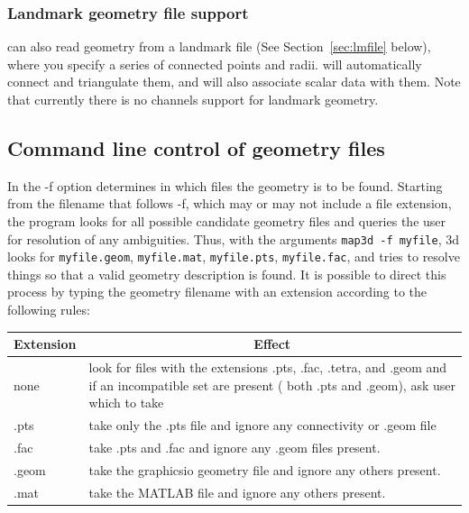 \subsubsection{Landmark geometry file support}
\label{sec:landmarkgeom}

\map{} can also read geometry from a landmark file 
(See Section~\ref{sec:lmfile} below), where you specify a series
of connected points and radii.  \map{} will automatically connect
and triangulate them, and will also associate scalar data with them.
Note that currently there is no channels support for landmark geometry.



\subsection{Command line control of geometry files}
\label{sec:readgeom}


In \map{} the -f option determines in which files the geometry is to be
found.  Starting from the filename that follows -f, which may or may not
include a file extension, the program looks for all possible candidate
geometry files and queries the user for resolution of any ambiguities.
Thus, with the arguments {\tt map3d -f myfile}, \map3d{} looks for
\texttt{myfile.geom}, \texttt{myfile.mat}, \texttt{myfile.pts},
\texttt{myfile.fac}, \etc{} and tries to resolve things so that a valid
geometry description is found.  It is possible to direct this process by
typing the geometry filename with an extension according to the following
rules:
%
\begin{center}
\begin{tabular}{|l|p{4in}|} \hline
\multicolumn{1}{|c|}{Extension} &
\multicolumn{1}{|c|}{Effect} \\ \hline
none & look for files with the extensions .pts, .fac, .tetra, and .geom and
if an incompatible set are present (\eg{} both .pts and .geom), ask user
which to take \\ 
.pts & take only the .pts file and ignore any connectivity or .geom file \\
.fac & take .pts and .fac and ignore any .geom files present. \\
.geom & take the graphicsio geometry file and ignore any others present. \\
.mat & take the MATLAB file and ignore any others present. \\ \hline
\end{tabular}
\end{center}

